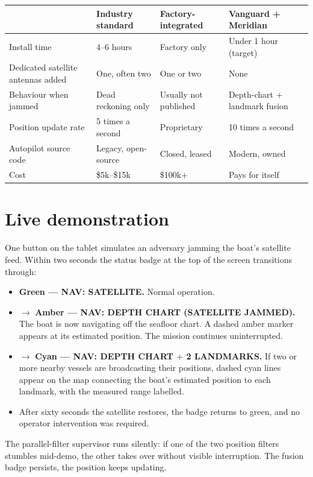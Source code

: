 \documentclass[10pt,a4paper]{article}
\begin{document}
\begin{tabularx}{\textwidth}{@{}L{38mm} X X X@{}}
\toprule
\textbf{} & \textbf{Industry standard} & \textbf{Factory-integrated} & \textbf{Vanguard + Meridian} \\
\midrule
{}
Install time & 4--6 hours & Factory only & Under 1 hour (target) \\
Dedicated satellite antennas added & One, often two & One or two & None \\
Behaviour when jammed & Dead reckoning only & Usually not published & Depth-chart + landmark fusion \\
Position update rate & 5 times a second & Proprietary & 10 times a second \\
Autopilot source code & Legacy, open-source & Closed, leased & Modern, owned \\
Cost & \$5k--\$15k & \$100k$+$ & Pays for itself \\
\bottomrule
\end{tabularx}

\section{Live demonstration}

One button on the tablet simulates an adversary jamming the boat's
satellite feed. Within two seconds the status badge at the top of the
screen transitions through:

\begin{itemize}
\item \textbf{Green --- NAV: SATELLITE.} Normal operation.
\item $\rightarrow$ \textbf{Amber --- NAV: DEPTH CHART (SATELLITE JAMMED).} The boat is now navigating off the seafloor chart. A dashed amber marker appears at its estimated position. The mission continues uninterrupted.
\item $\rightarrow$ \textbf{Cyan --- NAV: DEPTH CHART $+$ 2 LANDMARKS.} If two or more nearby vessels are broadcasting their positions, dashed cyan lines appear on the map connecting the boat's estimated position to each landmark, with the measured range labelled.
\item After sixty seconds the satellite restores, the badge returns to green, and no operator intervention was required.
\end{itemize}

The parallel-filter supervisor runs silently: if one of the two
position filters stumbles mid-demo, the other takes over without
visible interruption. The fusion badge persists, the position keeps
updating.
\end{document}
